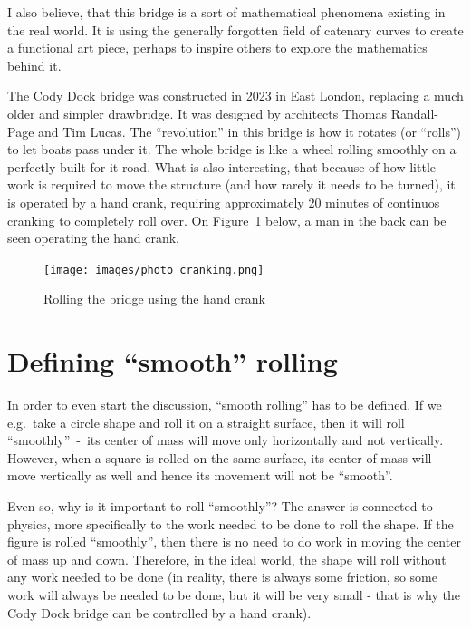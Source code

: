 \documentclass[12pt]{article}
\begin{document}
        I also believe, that this bridge is a sort of mathematical phenomena existing in the real world. It is using the generally forgotten field of catenary curves to create a functional art piece, perhaps to inspire others to explore the mathematics behind it.

        The Cody Dock bridge was constructed in 2023 in East London, replacing a much older and simpler drawbridge. It was designed by architects Thomas Randall-Page and Tim Lucas. The ``revolution'' in this bridge is how it rotates (or ``rolls'') to let boats pass under it. The whole bridge is like a wheel rolling smoothly on a perfectly built for it road. What is also interesting, that because of how little work is required to move the structure (and how rarely it needs to be turned), it is operated by a hand crank, requiring approximately 20 minutes of continuos cranking to completely roll over.\cite{bridge_newatlas,parker.2023} On Figure~\ref{fig:photo_cranking} below, a man in the back can be seen operating the hand crank.

        \begin{figure}[H]
            \centering
            \texttt{[image: images/photo\_cranking.png]}
            \caption[Rolling the bridge using the hand crank]{Rolling the bridge using the hand crank\footnotemark}\label{fig:photo_cranking}
        \end{figure}

    \section{Defining ``smooth'' rolling}

        In order to even start the discussion, ``smooth rolling'' has to be defined. If we e.g.\ take a circle shape and roll it on a straight surface, then it will roll ``smoothly''~-~its center of mass will move only horizontally and not vertically. However, when a square is rolled on the same surface, its center of mass will move vertically as well and hence its movement will not be ``smooth''.\cite{morphocular.2022,Hall_Wagon_1992}

        Even so, why is it important to roll ``smoothly''? The answer is connected to physics, more specifically to the work needed to be done to roll the shape. If the figure is rolled ``smoothly'', then there is no need to do work in moving the center of mass up and down. Therefore, in the ideal world, the shape will roll without any work needed to be done (in reality, there is always some friction, so some work will always be needed to be done, but it will be very small - that is why the Cody Dock bridge can be controlled by a hand crank).
\end{document}
